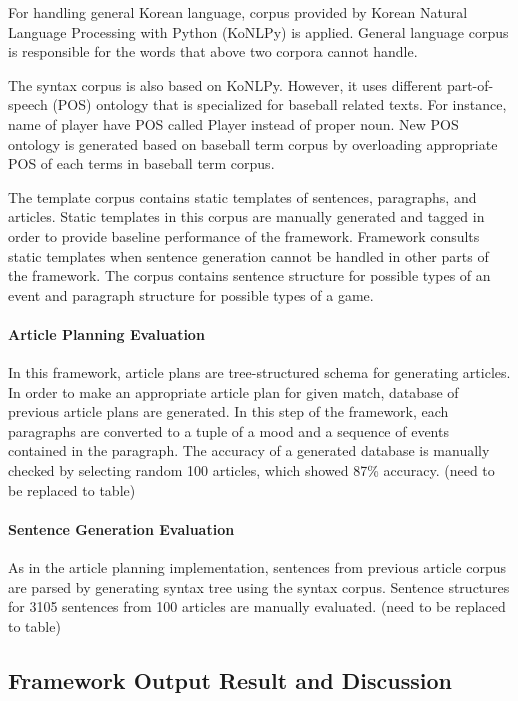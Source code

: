 \documentclass[11pt,letterpaper]{article}
\begin{document}
For handling general Korean language, corpus provided by Korean Natural Language Processing with Python (KoNLPy) is applied. General language corpus is responsible for the words that above two corpora cannot handle. 

The syntax corpus is also based on KoNLPy. However, it uses different part-of-speech (POS) ontology that is specialized for baseball related texts. For instance, name of player have POS called Player instead of proper noun. New POS ontology is generated based on baseball term corpus by overloading appropriate POS of each terms in baseball term corpus. 

The template corpus contains static templates of sentences, paragraphs, and articles. Static templates in this corpus are manually generated and tagged in order to provide baseline performance of the framework. Framework consults static templates when sentence generation cannot be handled in other parts of the framework. The corpus contains sentence structure for possible types of an event and paragraph structure for possible types of a game. 

\paragraph{Article Planning Evaluation}

In this framework, article plans are tree-structured schema for generating articles. In order to make an appropriate article plan for given match, database of previous article plans are generated. In this step of the framework, each paragraphs are converted to a tuple of a mood and a sequence of events contained in the paragraph. The accuracy of a generated database is manually checked by selecting random 100 articles, which showed 87\% accuracy. (need to be replaced to table)

\paragraph{Sentence Generation Evaluation} 

As in the article planning implementation, sentences from previous article corpus are parsed by generating syntax tree using the syntax corpus. Sentence structures for 3105 sentences from 100 articles are manually evaluated. (need to be replaced to table)


\subsection{Framework Output Result and Discussion}
\end{document}
